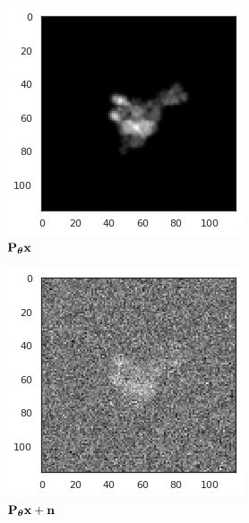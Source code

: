 \begin{figure}[ht!]
\begin{minipage}[b]{0.35\linewidth}
\begin{subfigure}[b]{0.49\textwidth}
            \includegraphics[width=0.8\linewidth]{figures/5j0n_noise0}
            \caption{$\mathbf{P}_{{\boldsymbol{\theta}}} \mathbf{x}$}
        \end{subfigure}
        \hfill
        \begin{subfigure}[b]{0.49\linewidth}
            \centering
            \includegraphics[width=0.8\linewidth]{figures/5j0n_noise16}
            \caption{$\mathbf{P}_{{\boldsymbol{\theta}}} \mathbf{x} + \mathbf{n}$}
        \end{subfigure}
        \\
        \begin{subfigure}[b]{0.49\linewidth}

\end{subfigure}
\end{minipage}
\end{figure}
